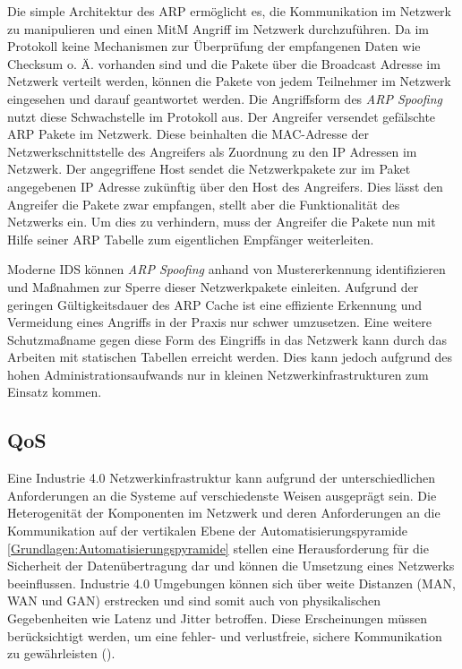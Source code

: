Die simple Architektur des \ac{ARP} ermöglicht es, die Kommunikation im Netzwerk zu manipulieren und einen \ac{MitM} Angriff im Netzwerk durchzuführen. Da im Protokoll keine Mechanismen zur Überprüfung der empfangenen Daten wie Checksum o. Ä. vorhanden sind und die Pakete über die Broadcast Adresse im Netzwerk verteilt werden, können die Pakete von jedem Teilnehmer im Netzwerk eingesehen und darauf geantwortet werden. Die Angriffsform des \textit{\ac{ARP} Spoofing} nutzt diese Schwachstelle im Protokoll aus. Der Angreifer versendet gefälschte \ac{ARP} Pakete im Netzwerk. Diese beinhalten die MAC-Adresse der Netzwerkschnittstelle des Angreifers als Zuordnung zu den \ac{IP} Adressen im Netzwerk. Der angegriffene Host sendet die Netzwerkpakete zur im Paket angegebenen \ac{IP} Adresse zukünftig über den Host des Angreifers. Dies lässt den Angreifer die Pakete zwar empfangen, stellt aber die Funktionalität des Netzwerks ein. Um dies zu verhindern, muss der Angreifer die Pakete nun mit Hilfe seiner \ac{ARP} Tabelle zum eigentlichen Empfänger weiterleiten.

Moderne \ac{IDS} können \textit{\ac{ARP} Spoofing} anhand von Mustererkennung identifizieren und Maßnahmen zur Sperre dieser Netzwerkpakete einleiten. Aufgrund der geringen Gültigkeitsdauer des \ac{ARP} Cache ist eine effiziente Erkennung und Vermeidung eines Angriffs in der Praxis nur schwer umzusetzen. Eine weitere Schutzmaßname gegen diese Form des Eingriffs in das Netzwerk kann durch das Arbeiten mit statischen Tabellen erreicht werden. Dies kann jedoch aufgrund des hohen Administrationsaufwands nur in kleinen Netzwerkinfrastrukturen zum Einsatz kommen.

\subsection{\ac{QoS}}
Eine Industrie 4.0 Netzwerkinfrastruktur kann aufgrund der unterschiedlichen Anforderungen an die Systeme auf verschiedenste Weisen ausgeprägt sein. Die Heterogenität der Komponenten im Netzwerk und deren Anforderungen an die Kommunikation auf der vertikalen Ebene der Automatisierungspyramide \autoref{Grundlagen:Automatisierungspyramide} stellen eine Herausforderung für die Sicherheit der Datenübertragung dar und können die Umsetzung eines Netzwerks beeinflussen. Industrie 4.0 Umgebungen können sich über weite Distanzen (\ac{MAN}, \ac{WAN} und \ac{GAN}) erstrecken und sind somit auch von physikalischen Gegebenheiten wie Latenz und Jitter betroffen. Diese Erscheinungen müssen berücksichtigt werden, um eine fehler- und verlustfreie, sichere Kommunikation zu gewährleisten (\cite{torscht2014}).

